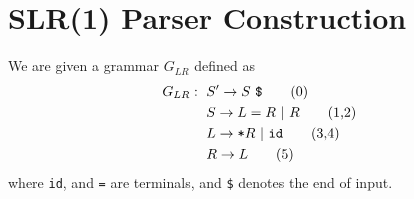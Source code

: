 %
%
%

\section{SLR(1) Parser Construction}
We are given a grammar $G_{LR}$ defined as
\begin{align}
	G_{LR} :{\ }
	&S' \rightarrow S{\ }\text{\tt \$} 					\tag{0} \\
	&S  \rightarrow L = R{\ }|{\ }R 						\tag{1,2} \\
	&L  \rightarrow \text{\tt *}R{\ }|{\ }\text{\tt id} 	\tag{3,4} \\
	&R  \rightarrow L 										\tag{5}
\end{align}
where {\tt id}, {\tt *} and {\tt =} are terminals, and {\tt \$} denotes the
end of input.

